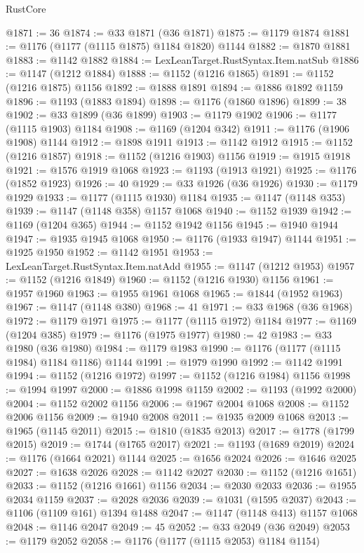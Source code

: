 \begin{lexlean}{RustCore}
\begin{coremodule}
@1871 := 36
@1874 := @33 @1871 (@36 @1871)
@1875 := @1179 @1874
@1881 := @1176 (@1177 (@1115 @1875) @1184 @1820) @1144
@1882 := @1870 @1881
@1883 := @1142 @1882
@1884 := LexLeanTarget.RustSyntax.Item.natSub
@1886 := @1147 (@1212 @1884)
@1888 := @1152 (@1216 @1865)
@1891 := @1152 (@1216 @1875) @1156
@1892 := @1888 @1891
@1894 := @1886 @1892 @1159
@1896 := @1193 (@1883 @1894)
@1898 := @1176 (@1860 @1896)
@1899 := 38
@1902 := @33 @1899 (@36 @1899)
@1903 := @1179 @1902
@1906 := @1177 (@1115 @1903) @1184
@1908 := @1169 (@1204 @342)
@1911 := @1176 (@1906 @1908) @1144
@1912 := @1898 @1911
@1913 := @1142 @1912
@1915 := @1152 (@1216 @1857)
@1918 := @1152 (@1216 @1903) @1156
@1919 := @1915 @1918
@1921 := @1576 @1919 @1068
@1923 := @1193 (@1913 @1921)
@1925 := @1176 (@1852 @1923)
@1926 := 40
@1929 := @33 @1926 (@36 @1926)
@1930 := @1179 @1929
@1933 := @1177 (@1115 @1930) @1184
@1935 := @1147 (@1148 @353)
@1939 := @1147 (@1148 @358) @1157 @1068
@1940 := @1152 @1939
@1942 := @1169 (@1204 @365)
@1944 := @1152 @1942 @1156
@1945 := @1940 @1944
@1947 := @1935 @1945 @1068
@1950 := @1176 (@1933 @1947) @1144
@1951 := @1925 @1950
@1952 := @1142 @1951
@1953 := LexLeanTarget.RustSyntax.Item.natAdd
@1955 := @1147 (@1212 @1953)
@1957 := @1152 (@1216 @1849)
@1960 := @1152 (@1216 @1930) @1156
@1961 := @1957 @1960
@1963 := @1955 @1961 @1068
@1965 := @1844 (@1952 @1963)
@1967 := @1147 (@1148 @380)
@1968 := 41
@1971 := @33 @1968 (@36 @1968)
@1972 := @1179 @1971
@1975 := @1177 (@1115 @1972) @1184
@1977 := @1169 (@1204 @385)
@1979 := @1176 (@1975 @1977)
@1980 := 42
@1983 := @33 @1980 (@36 @1980)
@1984 := @1179 @1983
@1990 := @1176 (@1177 (@1115 @1984) @1184 @1186) @1144
@1991 := @1979 @1990
@1992 := @1142 @1991
@1994 := @1152 (@1216 @1972)
@1997 := @1152 (@1216 @1984) @1156
@1998 := @1994 @1997
@2000 := @1886 @1998 @1159
@2002 := @1193 (@1992 @2000)
@2004 := @1152 @2002 @1156
@2006 := @1967 @2004 @1068
@2008 := @1152 @2006 @1156
@2009 := @1940 @2008
@2011 := @1935 @2009 @1068
@2013 := @1965 (@1145 @2011)
@2015 := @1810 (@1835 @2013)
@2017 := @1778 (@1799 @2015)
@2019 := @1744 (@1765 @2017)
@2021 := @1193 (@1689 @2019)
@2024 := @1176 (@1664 @2021) @1144
@2025 := @1656 @2024
@2026 := @1646 @2025
@2027 := @1638 @2026
@2028 := @1142 @2027
@2030 := @1152 (@1216 @1651)
@2033 := @1152 (@1216 @1661) @1156
@2034 := @2030 @2033
@2036 := @1955 @2034 @1159
@2037 := @2028 @2036
@2039 := @1031 (@1595 @2037)
@2043 := @1106 (@1109 @161) @1394 @1488
@2047 := @1147 (@1148 @413) @1157 @1068
@2048 := @1146 @2047
@2049 := 45
@2052 := @33 @2049 (@36 @2049)
@2053 := @1179 @2052
@2058 := @1176 (@1177 (@1115 @2053) @1184 @1154)

\end{coremodule}
\end{lexlean}
